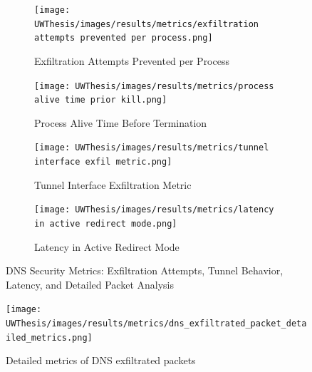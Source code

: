 \documentclass [11pt, proquest] {uwthesis}[2020/02/24]
\begin{document}
\begin{figure}[H]
  \centering

  \begin{subfigure}[b]{0.48\textwidth}
    \texttt{[image: UWThesis/images/results/metrics/exfiltration attempts prevented per process.png]}
    \caption{Exfiltration Attempts Prevented per Process}
  \end{subfigure}
  \hfill
  \begin{subfigure}[b]{0.48\textwidth}
    \texttt{[image: UWThesis/images/results/metrics/process alive time prior kill.png]}
    \caption{Process Alive Time Before Termination}
  \end{subfigure}
  \vspace{0.5cm}

  \begin{subfigure}[b]{0.48\textwidth}
    \texttt{[image: UWThesis/images/results/metrics/tunnel interface exfil metric.png]}
    \caption{Tunnel Interface Exfiltration Metric}
  \end{subfigure}
  \hfill
  \begin{subfigure}[b]{0.48\textwidth}
    \texttt{[image: UWThesis/images/results/metrics/latency in active redirect mode.png]}
    \caption{Latency in Active Redirect Mode}
  \end{subfigure}
  \caption{DNS Security Metrics: Exfiltration Attempts, Tunnel Behavior, Latency, and Detailed Packet Analysis}
  
  \vspace{0.8cm}
\end{figure}

\begin{figure}[H]
    \centering
    \texttt{[image: UWThesis/images/results/metrics/dns\_exfiltrated\_packet\_detailed\_metrics.png]}
    \caption{Detailed metrics of DNS exfiltrated packets}
    \label{fig:dns-exfil-packet-metrics}
\end{figure}
\end{document}
